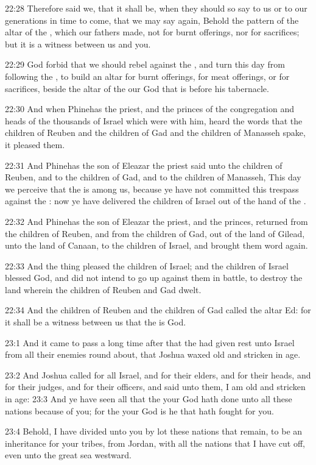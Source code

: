 22:28 Therefore said we, that it shall be, when they should so say to us or to our generations in time to come, that we may say again, Behold the pattern of the altar of the \LORD, which our fathers made, not for burnt offerings, nor for sacrifices; but it is a witness between us and you.

22:29 God forbid that we should rebel against the \LORD, and turn this day from following the \LORD, to build an altar for burnt offerings, for meat offerings, or for sacrifices, beside the altar of the \LORD our God that is before his tabernacle.

22:30 And when Phinehas the priest, and the princes of the congregation and heads of the thousands of Israel which were with him, heard the words that the children of Reuben and the children of Gad and the children of Manasseh spake, it pleased them.

22:31 And Phinehas the son of Eleazar the priest said unto the children of Reuben, and to the children of Gad, and to the children of Manasseh, This day we perceive that the \LORD is among us, because ye have not committed this trespass against the \LORD: now ye have delivered the children of Israel out of the hand of the \LORD.

22:32 And Phinehas the son of Eleazar the priest, and the princes, returned from the children of Reuben, and from the children of Gad, out of the land of Gilead, unto the land of Canaan, to the children of Israel, and brought them word again.

22:33 And the thing pleased the children of Israel; and the children of Israel blessed God, and did not intend to go up against them in battle, to destroy the land wherein the children of Reuben and Gad dwelt.

22:34 And the children of Reuben and the children of Gad called the altar Ed: for it shall be a witness between us that the \LORD is God.

23:1 And it came to pass a long time after that the \LORD had given rest unto Israel from all their enemies round about, that Joshua waxed old and stricken in age.

23:2 And Joshua called for all Israel, and for their elders, and for their heads, and for their judges, and for their officers, and said unto them, I am old and stricken in age: 23:3 And ye have seen all that the \LORD your God hath done unto all these nations because of you; for the \LORD your God is he that hath fought for you.

23:4 Behold, I have divided unto you by lot these nations that remain, to be an inheritance for your tribes, from Jordan, with all the nations that I have cut off, even unto the great sea westward.

